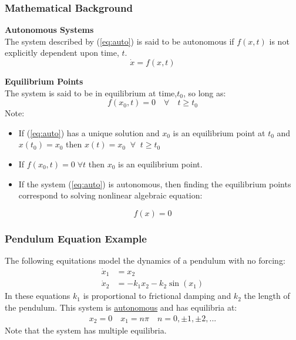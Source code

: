\documentclass[show notes]{beamer}       %
\begin{document}
\begin{frame}
\frametitle{Mathematical Background}
\textbf{Autonomous Systems}\\
The system described by (\ref{eq:auto}) is said to be autonomous if $f(x,t)$ is not explicitly dependent upon time, $t$.
\begin{equation}
\label{eq:auto}
\dot{x} = f(x,t)
\end{equation}

\textbf{Equilibrium Points}\\
The system is said to be in equilibrium at time,$t_0$, so long as:
\begin{equation}
f(x_0,t) = 0 \quad \forall \quad t \geq t_0
\end{equation}
Note:
\begin{itemize}
\item If (\ref{eq:auto}) has a unique solution and $x_0$ is an equilibrium point at $t_0$ and $x(t_0) = x_0$ then $x(t) = x_0 \;\; \forall \;\; t \geq t_0$
\item If $f(x_0,t) = 0 \; \forall t$ then $x_0$ is an equilibrium point.
\item If the system (\ref{eq:auto}) is autonomous, then finding the equilibrium points correspond to solving nonlinear algebraic equation:
\end{itemize}
\begin{equation}
f(x) = 0
\end{equation}
\end{frame}

\begin{frame}
\frametitle{Pendulum Equation Example}
The following equitations model the dynamics of a pendulum with no forcing:
\begin{equation}
\begin{aligned}
\dot{x}_1 &= x_2\\
\dot{x}_2 &= -k_1x_2 - k_2\sin(x_1)
\end{aligned}
\end{equation}
In these equations $k_1$ is proportional to frictional damping and $k_2$ the length of the pendulum. This system is \underline{autonomous} and has equilibria at:
\begin{equation}
\begin{aligned}
x_2 = 0 \quad x_1 = n\pi \quad n = 0,\pm1,\pm2,...
\end{aligned}
\end{equation}
Note that the system has multiple equilibria.
\end{frame}
\end{document}
